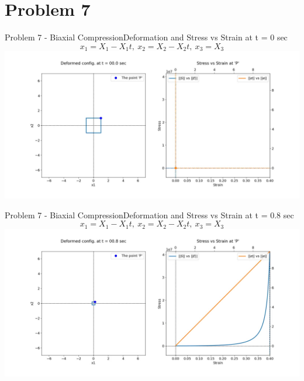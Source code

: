 \documentclass{beamer}
\begin{document}
\section{Problem 7}

\begin{frame}{Problem 7 - Biaxial Compression}{Deformation and Stress vs Strain at t = 0 sec}
    \vspace{-1em}
    \scriptsize $$x_1 = X_1 - X_1t,\ x_2 = X_2 - X_2t,\ x_3 = X_3$$
    \includegraphics[width=\textwidth, trim={4.5cm 2cm 3cm 1cm}, clip]{Plots/ibicompression.jpg}
\end{frame}

\begin{frame}{Problem 7 - Biaxial Compression}{Deformation and Stress vs Strain at t = 0.8 sec}
    \vspace{-1em}
    \scriptsize $$x_1 = X_1 - X_1t,\ x_2 = X_2 - X_2t,\ x_3 = X_3$$
    \includegraphics[width=\textwidth, trim={4.5cm 2cm 3cm 1cm}, clip]{Plots/bicompression.jpg}
\end{frame}
\end{document}
